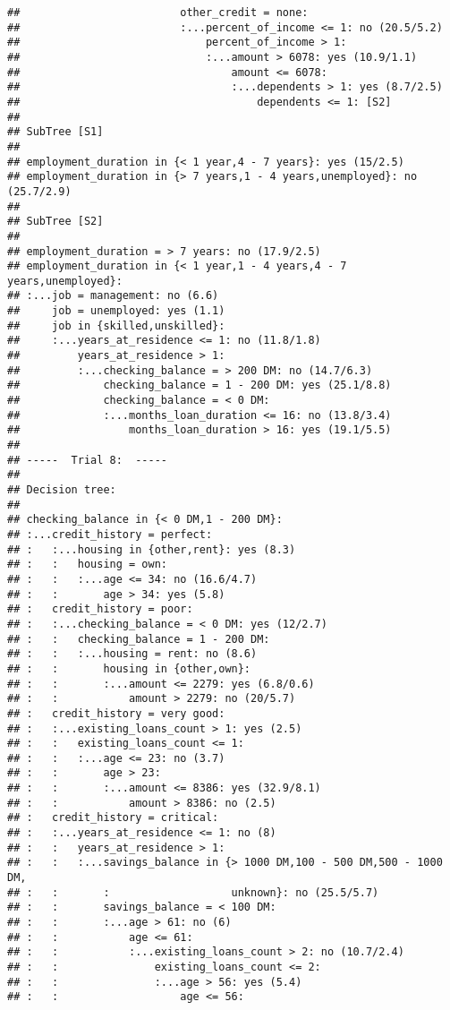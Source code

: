 \documentclass[
]{article}
\begin{document}
\begin{verbatim}
##                         other_credit = none:
##                         :...percent_of_income <= 1: no (20.5/5.2)
##                             percent_of_income > 1:
##                             :...amount > 6078: yes (10.9/1.1)
##                                 amount <= 6078:
##                                 :...dependents > 1: yes (8.7/2.5)
##                                     dependents <= 1: [S2]
## 
## SubTree [S1]
## 
## employment_duration in {< 1 year,4 - 7 years}: yes (15/2.5)
## employment_duration in {> 7 years,1 - 4 years,unemployed}: no (25.7/2.9)
## 
## SubTree [S2]
## 
## employment_duration = > 7 years: no (17.9/2.5)
## employment_duration in {< 1 year,1 - 4 years,4 - 7 years,unemployed}:
## :...job = management: no (6.6)
##     job = unemployed: yes (1.1)
##     job in {skilled,unskilled}:
##     :...years_at_residence <= 1: no (11.8/1.8)
##         years_at_residence > 1:
##         :...checking_balance = > 200 DM: no (14.7/6.3)
##             checking_balance = 1 - 200 DM: yes (25.1/8.8)
##             checking_balance = < 0 DM:
##             :...months_loan_duration <= 16: no (13.8/3.4)
##                 months_loan_duration > 16: yes (19.1/5.5)
## 
## -----  Trial 8:  -----
## 
## Decision tree:
## 
## checking_balance in {< 0 DM,1 - 200 DM}:
## :...credit_history = perfect:
## :   :...housing in {other,rent}: yes (8.3)
## :   :   housing = own:
## :   :   :...age <= 34: no (16.6/4.7)
## :   :       age > 34: yes (5.8)
## :   credit_history = poor:
## :   :...checking_balance = < 0 DM: yes (12/2.7)
## :   :   checking_balance = 1 - 200 DM:
## :   :   :...housing = rent: no (8.6)
## :   :       housing in {other,own}:
## :   :       :...amount <= 2279: yes (6.8/0.6)
## :   :           amount > 2279: no (20/5.7)
## :   credit_history = very good:
## :   :...existing_loans_count > 1: yes (2.5)
## :   :   existing_loans_count <= 1:
## :   :   :...age <= 23: no (3.7)
## :   :       age > 23:
## :   :       :...amount <= 8386: yes (32.9/8.1)
## :   :           amount > 8386: no (2.5)
## :   credit_history = critical:
## :   :...years_at_residence <= 1: no (8)
## :   :   years_at_residence > 1:
## :   :   :...savings_balance in {> 1000 DM,100 - 500 DM,500 - 1000 DM,
## :   :       :                   unknown}: no (25.5/5.7)
## :   :       savings_balance = < 100 DM:
## :   :       :...age > 61: no (6)
## :   :           age <= 61:
## :   :           :...existing_loans_count > 2: no (10.7/2.4)
## :   :               existing_loans_count <= 2:
## :   :               :...age > 56: yes (5.4)
## :   :                   age <= 56:

\end{verbatim}
\end{document}
